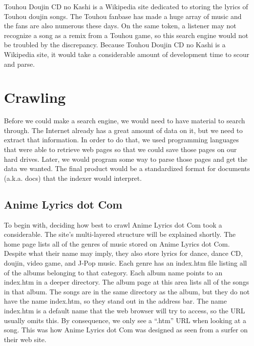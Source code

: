 \documentclass{acm} %
\begin{document}
\begin{CJK}{UTF8}{zhsong}
Touhou Doujin CD no Kashi is a Wikipedia site dedicated to storing the lyrics of Touhou doujin songs. The Touhou fanbase has made a huge array of music and the fans are also numerous these days. On the same token, a listener may not recognize a song as a remix from a Touhou game, so this search engine would not be troubled by the discrepancy. Because Touhou Doujin CD no Kashi is a Wikipedia site, it would take a considerable amount of development time to scour and parse.

\section{Crawling}

Before we could make a search engine, we would need to have material to search through. The Internet already has a great amount of data on it, but we need to extract that information. In order to do that, we used programming languages that were able to retrieve web pages so that we could save those pages on our hard drives. Later, we would program some way to parse those pages and get the data we wanted. The final product would be a standardized format for documents (a.k.a. docs) that the indexer would interpret.

\subsection{Anime Lyrics dot Com}


To begin with, deciding how best to crawl Anime Lyrics dot Com took a considerable. The site's multi-layered structure will be explained shortly. The home page lists all of the genres of music stored on Anime Lyrics dot Com. Despite what their name may imply, they also store lyrics for dance, dance CD, doujin, video game, and J-Pop music. Each genre has an index.htm file listing all of the albums belonging to that category. Each album name points to an index.htm in a deeper directory. The album page at this area lists all of the songs in that album. The songs are in the same directory as the album, but they do not have the name index.htm, so they stand out in the address bar. The name index.htm is a default name that the web browser will try to access, so the URL usually omits this. By consequence, we only see a ``.htm'' URL when looking at a song. This was how Anime Lyrics dot Com was designed as seen from a surfer on their web site.


\end{CJK}
\end{document}
